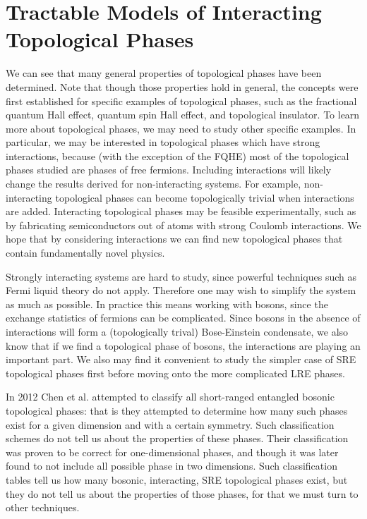 \section{Tractable Models of Interacting Topological Phases}

	We can see that many general properties of topological phases have been determined. Note that though those properties hold in general, the concepts were first established for specific examples of topological phases, such as the fractional quantum Hall effect, quantum spin Hall effect, and topological insulator. To learn more about topological phases, we may need to study other specific examples. In particular, we may be interested in topological phases which have strong interactions, because (with the exception of the FQHE) most of the topological phases studied are phases of free fermions.
Including interactions will likely change the results derived for non-interacting systems. For example, non-interacting topological phases can become topologically trivial when interactions are added\cite{FidkowskiKitaev2011}. Interacting topological phases may be feasible experimentally, such as by fabricating semiconductors out of atoms with strong Coulomb interactions\cite{something}. 
We hope that by considering interactions we can find new topological phases that contain fundamentally novel physics. 

Strongly interacting systems are hard to study, since powerful techniques such as Fermi liquid theory do not apply. Therefore one may wish to simplify the system as much as possible. 
In practice this means working with bosons, since the exchange statistics of fermions can be complicated. 
Since bosons in the absence of interactions will form a (topologically trival) Bose-Einstein condensate, we also know that if we find a topological phase of bosons, the interactions are playing an important part. We also may find it convenient to study the simpler case of SRE topological phases first before moving onto the more complicated LRE phases.

In 2012 Chen et al.\cite{WenScience,WenPRB} attempted to classify all short-ranged entangled bosonic topological phases: that is they attempted to determine how many such phases exist for a given dimension and with a certain symmetry. Such classification schemes do not tell us about the properties of these phases. Their classification was proven to be correct for one-dimensional phases, and though it was later found to not include all possible phase in two dimensions\cite{LuVishwanath,KapustinThorngren}. Such classification tables tell us how many bosonic, interacting, SRE topological phases exist, but they do not tell us about the properties of those phases, for that we must turn to other techniques.

